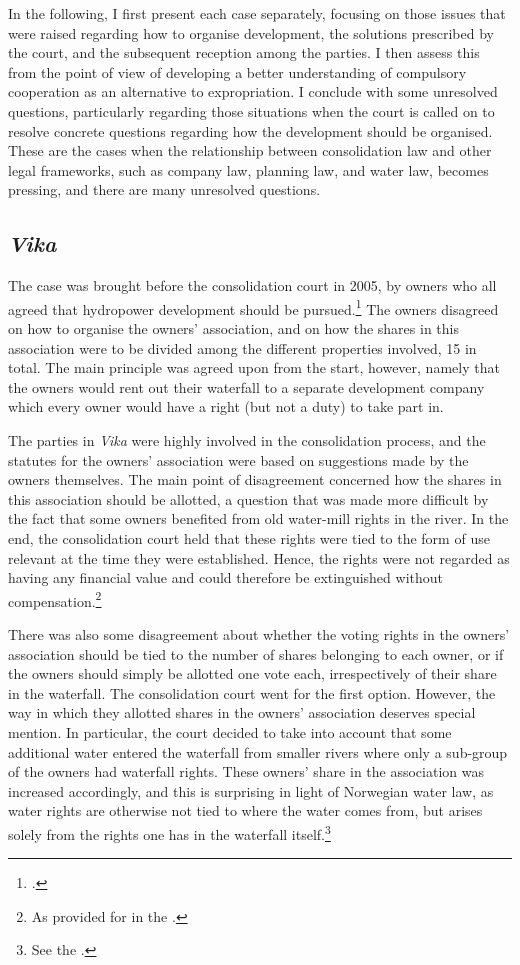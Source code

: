 In the following, I first present each case separately, focusing on those issues that were raised regarding how to organise development, the solutions prescribed by the court, and the subsequent reception among the parties. I then assess this from the point of view of developing a better understanding of compulsory cooperation as an alternative to expropriation. I conclude with some unresolved questions, particularly regarding those situations when the court is called on to resolve concrete questions regarding how the development should be organised. These are the cases when the relationship between consolidation law and other legal frameworks, such as company law, planning law, and water law, becomes pressing, and there are many unresolved questions.

\subsection{\emph{Vika}}

The case was brought before the consolidation court in 2005, by owners who all agreed that hydropower development should be pursued.\footcite{vika05} The owners disagreed on how to organise the owners' association, and on how the shares in this association were to be divided among the different properties involved, 15 in total. The main principle was agreed upon from the start, however, namely that the owners would rent out their waterfall to a separate development company which every owner would have a right (but not a duty) to take part in. 

The parties in \emph{Vika} were highly involved in the consolidation process, and the statutes for the owners' association were based on suggestions made by the owners themselves. The main point of disagreement concerned how the shares in this association should be allotted, a question that was made more difficult by the fact that some owners benefited from old water-mill rights in the river. In the end, the consolidation court held that these rights were tied to the form of use relevant at the time they were established. Hence, the rights were not regarded as having any financial value and could therefore be extinguished without compensation.\footnote{As provided for in the \cite[2|36|38]{lca79}.}

There was also some disagreement about whether the voting rights in the owners' association should be tied to the number of shares belonging to each owner, or if the owners should simply be allotted one vote each, irrespectively of their share in the waterfall. The consolidation court went for the first option. However, the way in which they allotted shares in the owners' association deserves special mention. In particular, the court decided to take into account that some additional water entered the waterfall from smaller rivers where only a sub-group of the owners had waterfall rights. These owners' share in the association was increased accordingly, and this is surprising in light of Norwegian water law, as water rights are otherwise not tied to where the water comes from, but arises solely from the rights one has in the waterfall itself.\footnote{See the \cite[13]{wra00}.}


